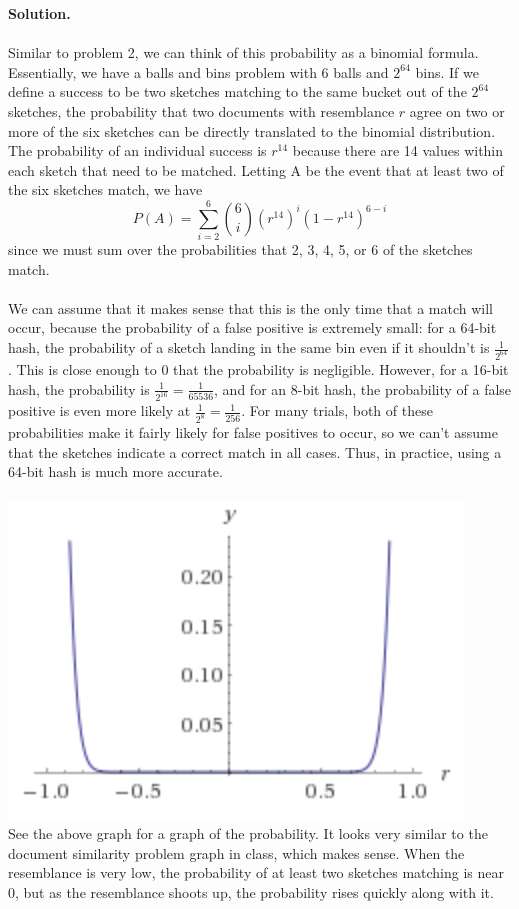 \documentclass[11pt]{article}
\newcommand\solution{%
  \textbf{Solution.}\\%
}
\begin{document}
\begin{enumerate}
\solution \\
Similar to problem 2, we can think of this probability as a binomial formula. Essentially, we have a balls and bins problem with 6 balls and $2^{64}$ bins. If we define a success to be two sketches matching to the same bucket out of the $2^{64}$ sketches, the probability that two documents with resemblance $r$ agree on two or more of the six sketches can be directly translated to the binomial distribution. The probability of an individual success is $r^{14}$ because there are 14 values within each sketch that need to be matched. Letting A be the event that at least two of the six sketches match, we have 
\begin{equation*}
  P(A) = \sum_{i = 2}^{6} {6 \choose i} (r^{14})^i (1-r^{14})^{6-i}
\end{equation*}
since we must sum over the probabilities that 2, 3, 4, 5, or 6 of the sketches match. \\
\\
We can assume that it makes sense that this is the only time that a match will occur, because the probability of a false positive is extremely small: for a 64-bit hash, the probability of a sketch landing in the same bin even if it shouldn't is $\frac{1}{2^{64}}$. This is close enough to 0 that the probability is negligible. However, for a 16-bit hash, the probability is $\frac{1}{2^{16}} = \frac{1}{65536}$, and for an 8-bit hash, the probability of a false positive is even more likely at $\frac{1}{2^8} = \frac{1}{256}$. For many trials, both of these probabilities make it fairly likely for false positives to occur, so we can't assume that the sketches indicate a correct match in all cases. Thus, in practice, using a 64-bit hash is much more accurate. \\
\\
\includegraphics{ps5graph} \\
See the above graph for a graph of the probability. It looks very similar to the document similarity problem graph in class, which makes sense. When the resemblance is very low, the probability of at least two sketches matching is near 0, but as the resemblance shoots up, the probability rises quickly along with it. 


\end{enumerate}
\end{document}
